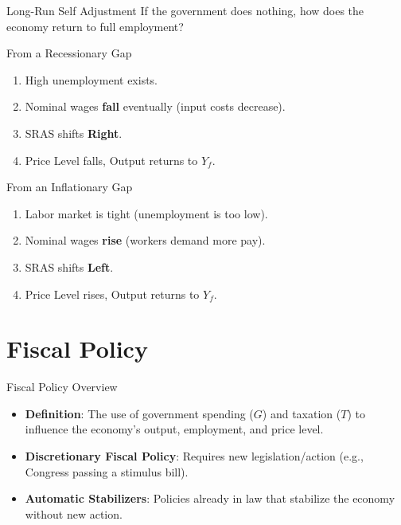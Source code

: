 \documentclass{beamer}
\begin{document}
\begin{frame}{Long-Run Self Adjustment}
    If the government does nothing, how does the economy return to full employment?
    \vspace{0.3cm}
    \begin{block}{From a Recessionary Gap}
        \begin{enumerate}
            \item High unemployment exists.
            \item Nominal wages \textbf{fall} eventually (input costs decrease).
            \item SRAS shifts \textbf{Right}.
            \item Price Level falls, Output returns to $Y_f$.
        \end{enumerate}
    \end{block}

    \begin{block}{From an Inflationary Gap}
        \begin{enumerate}
            \item Labor market is tight (unemployment is too low).
            \item Nominal wages \textbf{rise} (workers demand more pay).
            \item SRAS shifts \textbf{Left}.
            \item Price Level rises, Output returns to $Y_f$.
        \end{enumerate}
    \end{block}
\end{frame}

\section{Fiscal Policy}

\begin{frame}{Fiscal Policy Overview}
    \begin{itemize}
        \item \textbf{Definition}: The use of government spending ($G$) and taxation ($T$) to influence the economy's output, employment, and price level.
        \item \textbf{Discretionary Fiscal Policy}: Requires new legislation/action (e.g., Congress passing a stimulus bill).
        \item \textbf{Automatic Stabilizers}: Policies already in law that stabilize the economy without new action.
    \end{itemize}
\end{frame}
\end{document}
